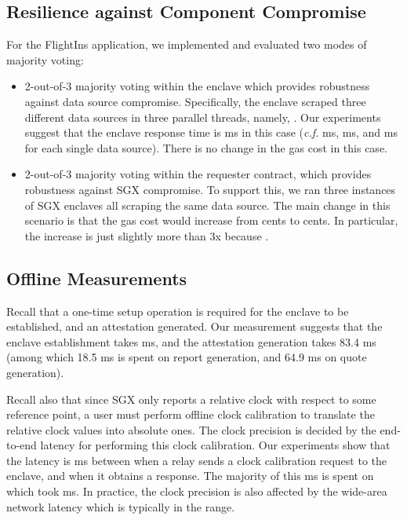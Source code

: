 \subsection{Resilience against Component Compromise}
For the {\sf FlightIns} application, 
we implemented and evaluated two modes of majority voting:
\begin{itemize}[leftmargin=3mm]
\item
2-out-of-3 majority voting within the enclave which provides robustness
against data source compromise.
Specifically, the enclave scraped three different data sources in three parallel threads, 
namely, .
Our experiments suggest that  
the enclave response time is 
 ms in this case ({\it c.f.}  ms, 
 ms, and  ms for 
each single data source).
There is no change in the gas cost in this case.
\item
2-out-of-3 majority voting within the requester contract,
which provides robustness against 
SGX compromise.
To support this, we ran three instances of SGX enclaves all scraping
the same data source.  
The main change in this scenario is that 
the gas cost would increase from
 cents 
to  cents.
In particular, the increase is just slightly more than 3x 
because .
\end{itemize}



\subsection{Offline Measurements}



Recall that a one-time setup operation is required 
for the enclave to be established, and an attestation generated. 
Our measurement suggests that the enclave establishment takes
 ms, 
and the attestation generation takes 
83.4 ms (among which 
18.5 ms is spent 
on report generation, 
and 64.9 ms on quote generation).

Recall also that since SGX only reports a relative clock
with respect to some reference point,  
a user must perform offline clock calibration 
to translate the  relative clock values into absolute ones.
The clock precision is decided
by the end-to-end latency for performing 
this clock calibration. 
Our experiments show that the latency is  ms 
between when a relay sends a clock calibration request
to the enclave, and when it obtains a response.
The majority of this  ms is spent on
which took  ms.
In practice, the clock precision is also affected
by the wide-area network latency
which is typically in the  range.

